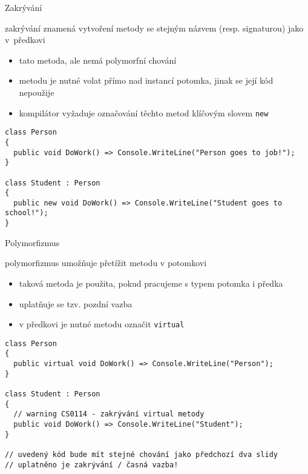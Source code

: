 \begin{frame}[fragile]
\begin{bitemize}{Zakrývání}
\item zakrývání znamená vytvoření metody se stejným názvem (resp. signaturou) jako v~předkovi
\begin{itemize}
\item tato metoda, ale nemá polymorfní chování
\item metodu je nutné volat přímo nad instancí potomka, jinak se její kód nepoužije
\item kompilátor vyžaduje označování těchto metod klíčovým slovem \lstinline|new|
\end{itemize}
\end{bitemize}
\vfill
\begin{yesblock}
\begin{lstlisting}[basicstyle=\small]
class Person
{
  public void DoWork() => Console.WriteLine("Person goes to job!");
}

class Student : Person
{
  public new void DoWork() => Console.WriteLine("Student goes to school!");
}
\end{lstlisting}
\end{yesblock}
\end{frame}



\begin{frame}[fragile]
\begin{bitemize}{Polymorfizmus}
\item polymorfizmus umožňuje přetížit metodu v potomkovi
\begin{itemize}
\item taková metoda je použita, pokud pracujeme s typem potomka i předka
\item uplatňuje se tzv. pozdní vazba
\item v předkovi je nutné metodu označit \lstinline|virtual|
\end{itemize}
\end{bitemize}
\vfill
\begin{noblock}
\begin{lstlisting}[basicstyle=\small]
class Person
{
  public virtual void DoWork() => Console.WriteLine("Person");
}

class Student : Person
{
  // warning CS0114 - zakrývání virtual metody
  public void DoWork() => Console.WriteLine("Student");
}

// uvedený kód bude mít stejné chování jako předchozí dva slidy
// uplatněno je zakrývání / časná vazba!
\end{lstlisting}
\end{noblock}
\end{frame}



